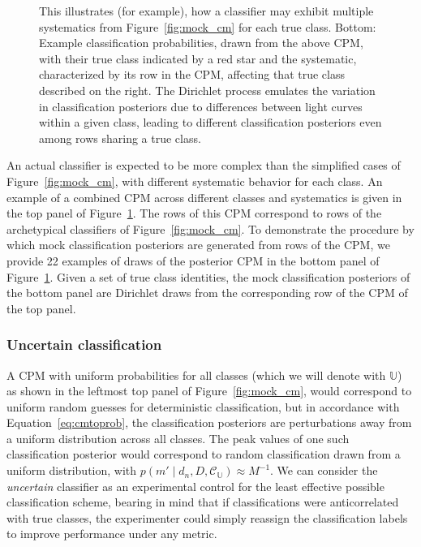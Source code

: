\begin{figure}
\begin{center}
{		This illustrates (for example), how a classifier may exhibit multiple systematics from Figure~\ref{fig:mock_cm} for each true class.
		Bottom: Example classification probabilities, drawn from the above CPM, with their true class indicated by a red star and the systematic, characterized by its row in the CPM, affecting that true class described on the right.
		The Dirichlet process emulates the variation in classification posteriors due to differences between light curves within a given class, leading to different classification posteriors even among rows sharing a true class.
		}
		\label{fig:mock_probs}
	\end{center}
\end{figure}

An actual classifier is expected to be more complex than the simplified cases of Figure~\ref{fig:mock_cm}, with different systematic behavior for each class.
An example of a combined CPM across different classes and systematics is given in the top panel of Figure~\ref{fig:mock_probs}.
The rows of this CPM correspond to rows of the archetypical classifiers of Figure~\ref{fig:mock_cm}.
To demonstrate the procedure by which mock classification posteriors are generated from rows of the CPM, we provide 22 examples of draws of the posterior CPM in the bottom panel of Figure~\ref{fig:mock_probs}.
Given a set of true class identities, the mock classification posteriors of the bottom panel are Dirichlet draws from the corresponding row of the CPM of the top panel.

\subsubsection{Uncertain classification}
\label{sec:uncertaindata}

A CPM with uniform probabilities for all classes (which we will denote with $\mathbb{U}$) as shown in the leftmost top panel of Figure~\ref{fig:mock_cm}, would correspond to uniform random guesses for deterministic classification, but in accordance with Equation~\ref{eq:cmtoprob}, the classification posteriors are perturbations away from a uniform distribution across all classes.
The peak values of one such classification posterior would correspond to random classification drawn from a uniform distribution, with $p(m' \mid d_{n}, D, \mathcal{C}_{\mathbb{U}}) \approx M^{-1}$.
We can consider the \textit{uncertain} classifier as an experimental control for the least effective possible classification scheme, bearing in mind that if classifications were anticorrelated with true classes, the experimenter could simply reassign the classification labels to improve performance under any metric.

